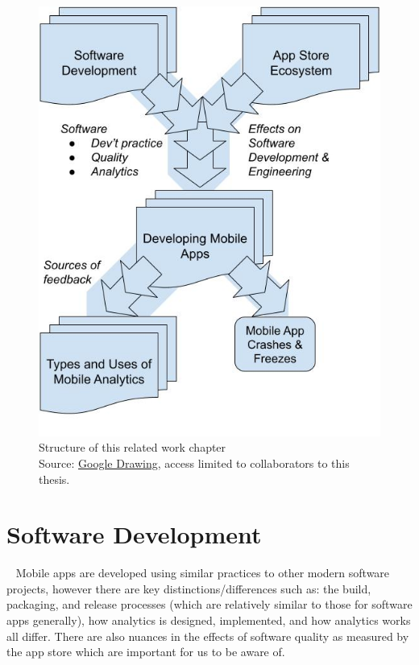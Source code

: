 \begin{figure}
    \centering
    \includegraphics[width=\textwidth]{images/my/related-work-chapter-structure-27-jul-2022b.jpeg}
    \caption{Structure of this related work chapter\\ Source: \href{https://docs.google.com/drawings/d/1DosM__BfTGqoIYkkkltbyDreCT5wYC1Z0mR9i1ZSxWc/edit?usp=sharing}{Google Drawing}, access limited to collaborators to this thesis.}
    \label{fig:related-work-chapter-structure}
\end{figure}



\section{Software Development}~\label{rw-software-development-section}
Mobile apps are developed using similar practices to other modern software projects, however there are key distinctions/differences such as: the build, packaging, and release processes (which are relatively similar to those for software apps generally), how analytics is designed, implemented, and how analytics works all differ. There are also nuances in the effects of software quality as measured by the app store which are important for us to be aware of.

